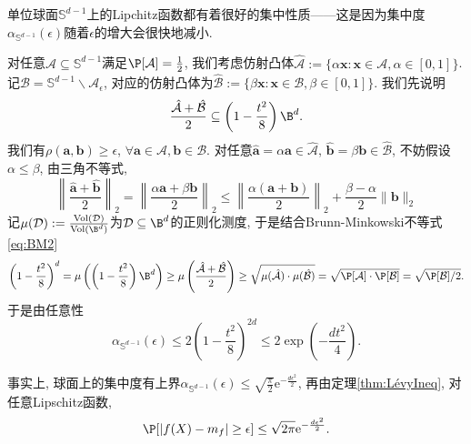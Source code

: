 \begin{example}[单位球面上的Lévy集中度]
	单位球面$\mathbb{S}^{d-1}$上的Lipchitz函数都有着很好的集中性质——这是因为集中度$\alpha_{\mathbb{S}^{d-1}}(\epsilon)$随着$\epsilon$的增大会很快地减小. 
	
	对任意$\mathcal{A} \subseteq \mathbb{S}^{d-1}$满足$\P[\mathcal{A}] = \frac{1}{2}$, 我们考虑仿射凸体$\hat{\mathcal{A}} := \{\alpha \bm{x} \colon \bm{x} \in \mathcal{A}, \alpha \in [0,1] \}$. 
	记$\mathcal{B} = \mathbb{S}^{d-1} \backslash \mathcal{A}_{\epsilon}$, 对应的仿射凸体为$\hat{\mathcal{B}} := \{\beta \bm{x} \colon \bm{x} \in \mathcal{B}, \beta \in [0,1] \}$. 
	我们先说明
	\begin{equation*}
		\frac{\hat{\mathcal{A}} + \hat{\mathcal{B}}}{2} \subseteq \left(1 - \frac{t^2}{8} \right) \B^d. 
	\end{equation*}
	我们有$\rho(\bm{a}, \bm{b}) \geq \epsilon$, $\forall \bm{a} \in \mathcal{A}, \bm{b} \in \mathcal{B}$. 
	对任意$\hat{\bm{a}} = \alpha \bm{a} \in \hat{\mathcal{A}}$, $\hat{\bm{b}} = \beta \bm{b} \in \hat{\mathcal{B}}$, 不妨假设$\alpha \leq \beta$, 由三角不等式,
	\begin{equation*}
		\left\| \frac{\hat{\bm{a}} + \hat{\bm{b}}}{2} \right\|_2
		= \left\| \frac{\alpha \bm{a} + \beta \bm{b}}{2} \right\|_2 
		\leq \left\| \frac{\alpha(\bm{a} + \bm{b})}{2} \right\|_2 + \frac{\beta - \alpha}{2} \|\bm{b}\|_2
	\end{equation*}
	记$\mu(\mathcal{D}) := \frac{\vol(\mathcal{D})}{\vol(\B^d)}$为$\mathcal{D} \subseteq \B^d$的正则化测度, 于是结合Brunn-Minkowski不等式\eqref{eq:BM2}
	\begin{equation*}
		\left(1 - \frac{t^2}{8} \right)^d 
		= \mu \left(\left(1 - \frac{t^2}{8} \right) \B^d\right)
		\geq \mu\left(\frac{\hat{\mathcal{A}} + \hat{\mathcal{B}}}{2}\right)
		\geq \sqrt{\mu(\hat{\mathcal{A}}) \cdot \mu(\hat{\mathcal{B}})}
		= \sqrt{\P[\mathcal{A}] \cdot \P[\mathcal{B}]}
		= \sqrt{\P[\mathcal{B}] / 2}. 
	\end{equation*}
	于是由任意性
	\begin{equation*}
		\alpha_{\mathbb{S}^{d-1}}(\epsilon)
		\leq 2 \left(1 - \frac{t^2}{8} \right)^{2d}
		\leq 2 \exp\left( - \frac{d t^2}{4} \right). 
	\end{equation*}
	
	事实上, 球面上的集中度有上界$\alpha_{\mathbb{S}^{d-1}}(\epsilon) \leq \sqrt{\frac{\pi}{2}} \mathrm{e}^{-\frac{d \epsilon^2}{2}}$, 再由定理\ref{thm:LévyIneq}, 对任意Lipschitz函数, 
	\begin{equation*}
		\P[|f(X) - m_f| \geq \epsilon] \leq \sqrt{2 \pi} \mathrm{e}^{-\frac{d \epsilon^2}{2}}. 
	\end{equation*} 
	

\end{example}
